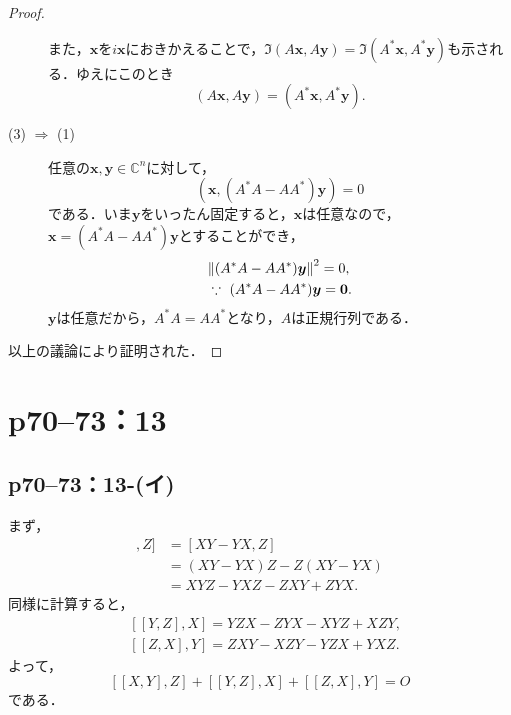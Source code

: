 \documentclass[a4paper,10pt,fleqn]{ltjsarticle}
\begin{document}
\begin{tleftbar}
\begin{proof}
\begin{description}
                  また，$\bm{x}$を$i\bm{x}$におきかえることで，$ \Im (A\bm{x}, A\bm{y}) = \Im (A^\ast \bm{x}, A^\ast\bm{y})$も示される．ゆえにこのとき
                  \[
                      (A\bm{x}, A\bm{y}) = (A^\ast \bm{x}, A^\ast\bm{y}).
                  \]
            \item[(3) $\Longrightarrow$ (1)] 任意の$\bm{x},\bm{y} \in \mathbb{C}^n$に対して，
                  \[
                      (\bm{x}, (A^\ast A-A A^\ast)\bm{y}) =0
                  \]
                  である．いま$\bm{y}$をいったん固定すると，$\bm{x}$は任意なので，$\bm{x}=(A^\ast A-A A^\ast)\bm{y}$とすることができ，
                  \begin{align*}
                       & \norm{(A^\ast A-A A^\ast)\bm{y}}^2  = 0,       \\
                       & \because ~ (A^\ast A-A A^\ast)\bm{y} = \bm{0}.
                  \end{align*}
                  $\bm{y}$は任意だから，$A^\ast A=A A^\ast$となり，$A$は正規行列である．
        \end{description}
        以上の議論により証明された．
    \end{proof}
\end{tleftbar}

\newpage


\section*{p70--73：13}

\subsection*{p70--73：13-(イ)}

\begin{tleftbar}
    まず，
    \begin{align*}
        [ [X,Y],Z ] & = [XY-YX,Z]           \\
                    & = (XY-YX)Z -Z(XY-YX)  \\
                    & = XYZ -YXZ -ZXY +ZYX.
    \end{align*}
    同様に計算すると，
    \begin{align*}
         & [[Y,Z],X] = YZX -ZYX -XYZ +XZY,  \\
         & [ [Z,X],Y] = ZXY -XZY -YZX +YXZ.
    \end{align*}
    よって，
    \[
        [[X,Y],Z] +[[Y,Z],X]+[[Z,X],Y]=O
    \]
    である．
\end{tleftbar}
\end{document}

